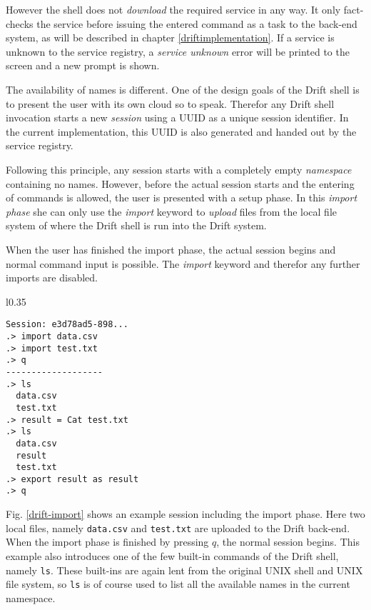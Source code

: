However the shell does not \textit{download} the required service
in any way. It only fact-checks the service before issuing the
entered command as a task to the back-end system, as will be
described in chapter \ref{driftimplementation}.
If a service is unknown to the service registry, a
\textit{service unknown} error will be printed to the screen
and a new prompt is shown.
\newline

The availability of names is different. One of the design goals
of the Drift shell is to present the user with its own cloud so
to speak. Therefor any Drift shell invocation starts a new
\textit{session} using a UUID as a unique session identifier.
In the current implementation, this UUID is also generated and
handed out by the service registry.

Following this principle, any session starts with a
completely empty \textit{namespace} containing no names. However,
before the actual session starts and the entering of commands is allowed,
the user is presented with a setup phase. In this \textit{import phase}
she can only use the \textit{import} keyword to \textit{upload}
files from the local file system of where the Drift shell is run
into the Drift system.

When the user has finished the import phase, the actual session
begins and normal command input is possible. The \textit{import}
keyword and therefor any further imports are disabled.

\begin{wrapfigure}{l}{0.35\textwidth}
  \begin{lstlisting}
Session: e3d78ad5-898...
.> import data.csv
.> import test.txt
.> q
-------------------
.> ls
  data.csv
  test.txt
.> result = Cat test.txt
.> ls
  data.csv
  result
  test.txt
.> export result as result
.> q

  \end{lstlisting}
  \caption{Example of a short Drift session.}
  \label{drift-import}
\end{wrapfigure}

Fig. \ref{drift-import} shows an example session including the import
phase. Here two local files, namely \texttt{data.csv} and
\texttt{test.txt} are uploaded to the Drift back-end. When the
import phase is finished by pressing $q$, the normal session
begins. This example also introduces one of the few built-in
commands of the Drift shell, namely \texttt{ls}. These built-ins
are again lent from the original UNIX shell and UNIX file system,
so \texttt{ls} is of course used to list all the available names
in the current namespace.

